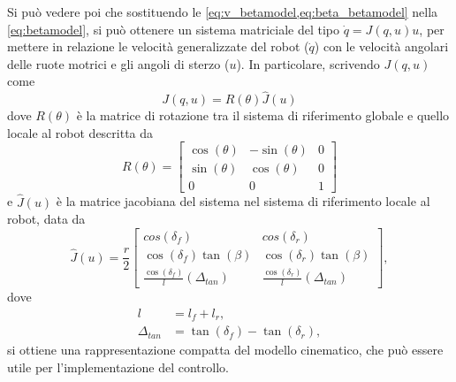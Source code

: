 Si può vedere poi che sostituendo le \cref{eq:v_betamodel,eq:beta_betamodel} nella \cref{eq:betamodel}, si può ottenere un sistema matriciale del tipo $\dot{q} = J(q,u)u$, per mettere in relazione le velocità generalizzate del robot ($\dot{q}$) con le velocità angolari delle ruote motrici e gli angoli di sterzo ($u$). In particolare, scrivendo $J(q,u)$ come
\begin{equation}
    J(q,u) = R(\theta)\hat{J}(u)
\end{equation}
dove $R(\theta)$ è la matrice di rotazione tra il sistema di riferimento globale e quello locale al robot descritta da
\begin{equation}\label{eq:Rtheta}
    R(\theta) = \begin{bmatrix}
        \cos(\theta) & -\sin(\theta) & 0 \\
        \sin(\theta) & \cos(\theta)  & 0 \\
        0            & 0             & 1
    \end{bmatrix}
\end{equation}
e $\hat{J}(u)$ è la matrice jacobiana del sistema nel sistema di riferimento locale al robot, data da
\begin{equation}\label{eq:Jhat}
    \hat{J}(u) = \frac{r}{2}\begin{bmatrix}
        cos(\delta_f)                          & cos(\delta_r)                          \\
        \cos(\delta_f)\tan(\beta)              & \cos(\delta_r)\tan(\beta)              \\
        \frac{\cos(\delta_f)}{l}(\Delta_{tan}) & \frac{\cos(\delta_r)}{l}(\Delta_{tan})
    \end{bmatrix},
\end{equation}
dove
\begin{align}
    l            & =  l_f + l_r, \label{eq:l}                             \\
    \Delta_{tan} & =  \tan(\delta_f) - \tan(\delta_r),\label{eq:deltatan}
\end{align}
si ottiene una rappresentazione compatta del modello cinematico, che può essere utile per l'implementazione del controllo.
